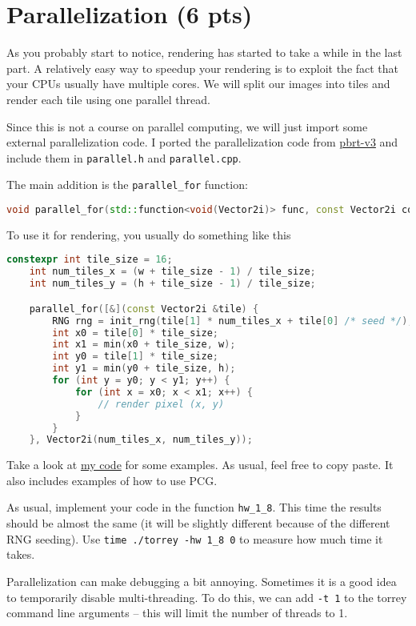 \section{Parallelization (6 pts)}
As you probably start to notice, rendering has started to take a while in the last part. A relatively easy way to speedup your rendering is to exploit the fact that your CPUs usually have multiple cores. We will split our images into tiles and render each tile using one parallel thread.

Since this is not a course on parallel computing, we will just import some external parallelization code. I ported the parallelization code from \href{https://github.com/mmp/pbrt-v3/blob/master/src/core/parallel.h}{pbrt-v3} and include them in \lstinline{parallel.h} and \lstinline{parallel.cpp}.

The main addition is the \lstinline{parallel_for} function:
\begin{lstlisting}[language=C++]
void parallel_for(std::function<void(Vector2i)> func, const Vector2i count);
\end{lstlisting}

To use it for rendering, you usually do something like this
\begin{lstlisting}[language=C++]
    constexpr int tile_size = 16;
    int num_tiles_x = (w + tile_size - 1) / tile_size;
    int num_tiles_y = (h + tile_size - 1) / tile_size;

    parallel_for([&](const Vector2i &tile) {
        RNG rng = init_rng(tile[1] * num_tiles_x + tile[0] /* seed */);
        int x0 = tile[0] * tile_size;
        int x1 = min(x0 + tile_size, w);
        int y0 = tile[1] * tile_size;
        int y1 = min(y0 + tile_size, h);
        for (int y = y0; y < y1; y++) {
            for (int x = x0; x < x1; x++) {
                // render pixel (x, y)
            }
        }
    }, Vector2i(num_tiles_x, num_tiles_y));
\end{lstlisting}

Take a look at \href{https://github.com/BachiLi/lajolla_public/tree/main/src/render.cpp}{my code} for some examples. As usual, feel free to copy paste. It also includes examples of how to use PCG.

As usual, implement your code in the function \lstinline{hw_1_8}. This time the results should be almost the same (it will be slightly different because of the different RNG seeding). Use \lstinline{time ./torrey -hw 1_8 0} to measure how much time it takes.

Parallelization can make debugging a bit annoying. Sometimes it is a good idea to temporarily disable multi-threading. To do this, we can add \lstinline{-t 1} to the torrey command line arguments -- this will limit the number of threads to 1.

